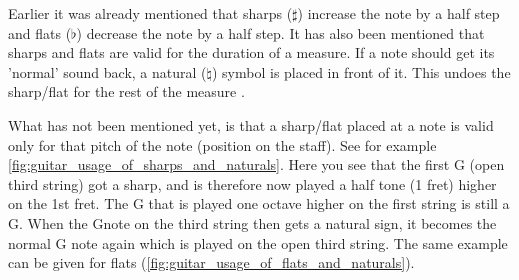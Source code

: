 Earlier it was already mentioned that sharps ($\sharp$) increase the note by a half step and flats ($\flat$) decrease the note by a half step. It has also been mentioned that sharps and flats are valid for the duration of a measure. If a note should get its 'normal' sound back, a natural ($\natural$) symbol is placed in front of it. This undoes the sharp/flat for the rest of the measure .

What has not been mentioned yet, is that a sharp/flat placed at a note is valid only for that pitch of the note (position on the staff). See for example \autoref{fig:guitar_usage_of_sharps_and_naturals}. Here you see that the first G (open third string) got a sharp, and is therefore now played a half tone (1 fret) higher on the 1st fret. The G that is played one octave higher on the first string is still a G. When the G\sharp note on the third string then gets a natural sign, it becomes the normal G note again which is played on the open third string. The same example can be given for flats (\autoref{fig:guitar_usage_of_flats_and_naturals}).

